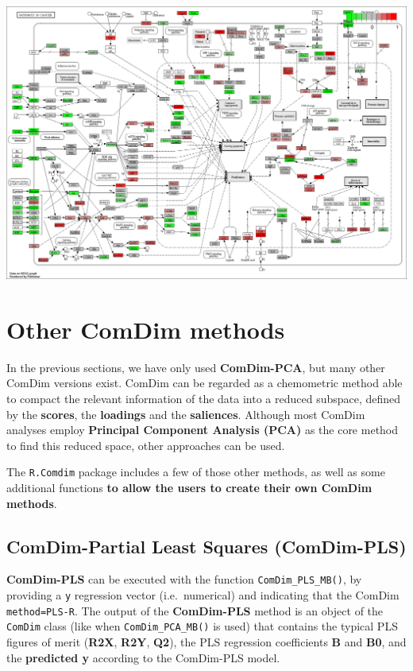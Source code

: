 \documentclass[
]{book}
\begin{document}
\includegraphics{Figs/mmu05200.ComDim.png}

\hypertarget{Section6}{%
\chapter{Other ComDim methods}\label{Section6}}

In the previous sections, we have only used \textbf{ComDim-PCA}, but many other
ComDim versions exist. ComDim can be regarded as a chemometric method able to
compact the relevant information of the data into a reduced subspace, defined by
the \textbf{scores}, the \textbf{loadings} and the \textbf{saliences}.
Although most ComDim analyses employ \textbf{Principal Component Analysis (PCA)} as
the core method to find this reduced space, other approaches can be used.

The \texttt{R.Comdim} package includes a few of those other methods, as well as some
additional functions \textbf{to allow the users to create their own ComDim methods}.

\hypertarget{PLS}{%
\section{ComDim-Partial Least Squares (ComDim-PLS)}\label{PLS}}

\textbf{ComDim-PLS} can be executed with the function \texttt{ComDim\_PLS\_MB()}, by
providing a \texttt{y} regression vector (i.e.~numerical) and indicating that the
ComDim \texttt{method=\textquotesingle{}PLS-R}.
The output of the \textbf{ComDim-PLS} method is an object of the \texttt{ComDim} class (like
when \texttt{ComDim\_PCA\_MB()} is used) that contains the typical PLS figures of merit
(\textbf{R2X}, \textbf{R2Y}, \textbf{Q2}), the PLS regression coefficients \textbf{B} and \textbf{B0},
and the \textbf{predicted y} according to the ComDim-PLS model.
\end{document}
